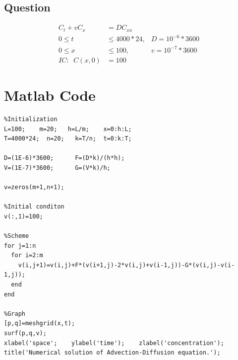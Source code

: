 \subsection{Question}
\begin{align*}
  C_t + vC_x &= D C_{xx} \\
  0 \leq t &\leq 4000*24,          &       D=10^{-6}*3600\\
  0 \leq x &\leq 100,          &       v=10^{-7}*3600\\
  IC: \;\; C(x,0) &= 100
\end{align*}

\section{Matlab Code}

\begin{verbatim}
%Initialization
L=100;    m=20;   h=L/m;    x=0:h:L;
T=4000*24;  n=20;   k=T/n;  t=0:k:T;

D=(1E-6)*3600;      F=(D*k)/(h*h);
V=(1E-7)*3600;      G=(V*k)/h;

v=zeros(m+1,n+1);

%Initial conditon
v(:,1)=100;

%Scheme
for j=1:n
  for i=2:m
    v(i,j+1)=v(i,j)+F*(v(i+1,j)-2*v(i,j)+v(i-1,j))-G*(v(i,j)-v(i-1,j));
  end
end

%Graph
[p,q]=meshgrid(x,t);
surf(p,q,v);
xlabel('space';    ylabel('time');    zlabel('concentration');
title('Numerical solution of Advection-Diffusion equation.');
\end{verbatim}


